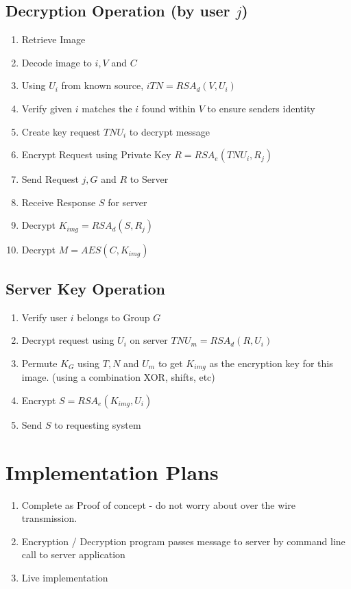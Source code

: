 \documentclass[11pt]{article}
\begin{document}
\subsection{Decryption Operation (by user $j$)}
\begin{enumerate}
  \item Retrieve Image
  \item Decode image to $i, V$ and $C$
  \item Using $U_{i}$ from known source, $iTN = RSA_{d}(V,U_{i})$
  \item Verify given $i$ matches the $i$ found within $V$ to ensure senders identity
  \item Create key request $TNU_{i}$ to decrypt message
  \item Encrypt Request using Private Key $R = RSA_{e}(TNU_{i},R_{j})$
  \item Send Request $j, G$ and $R$ to Server
  \item Receive Response $S$ for server
  \item Decrypt $K_{img} = RSA_{d}(S,R_{j})$
  \item Decrypt $M = AES(C,K_{img})$
\end{enumerate}

\subsection{Server Key Operation}
\begin{enumerate}
  \item Verify user $i$ belongs to Group $G$
  \item Decrypt request using $U_{i}$ on server $TNU_{m} = RSA_{d}(R,U_{i})$
  \item Permute $K_{G}$ using $T, N$ and $U_{m}$ to get $K_{img}$ as the encryption key for this image. (using a combination XOR, shifts, etc)
  \item Encrypt $S = RSA_{e}(K_{img},U_{i})$
  \item Send $S$ to requesting system
\end{enumerate}

\section{Implementation Plans}
\begin{enumerate}
  \item Complete as Proof of concept - do not worry about over the wire transmission.  
  \item Encryption / Decryption program passes message to server by command line call to server application
  \item Live implementation
\end{enumerate}
   
\end{document}
